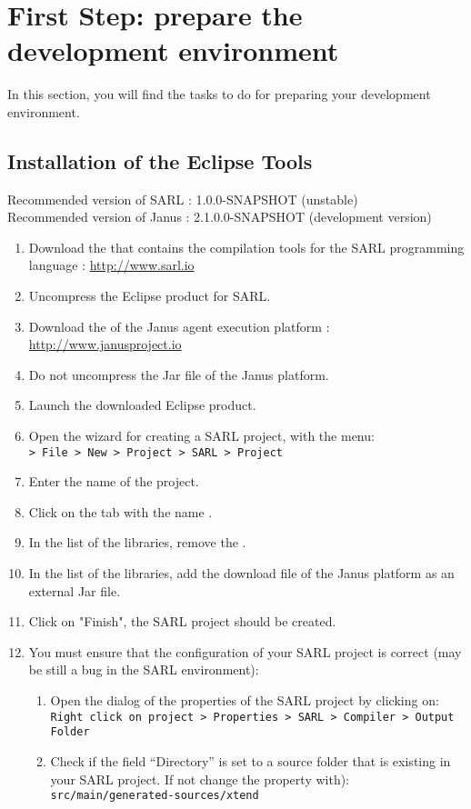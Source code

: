 \section{First Step: prepare the development environment}

In this section, you will find the tasks to do for preparing your development environment.

\subsection{Installation of the Eclipse Tools}

\begin{emphbox}
Recommended version of SARL : 1.0.0-SNAPSHOT (unstable) \\
Recommended version of Janus : 2.1.0.0-SNAPSHOT (development version)
\end{emphbox}

\begin{enumerate}
\item Download the  that contains the compilation tools for the SARL programming language : \url{http://www.sarl.io}
\item Uncompress the Eclipse product for SARL.
\item Download the  of the Janus agent execution platform : \url{http://www.janusproject.io}
\item Do not uncompress the Jar file of the Janus platform.
\item Launch the downloaded Eclipse product.
\item Open the wizard for creating a SARL project, with the menu: \\
	\texttt{> File > New > Project > SARL > Project}
\item Enter the name of the project.
\item Click on the tab with the name .
\item In the list of the libraries, remove the .
\item In the list of the libraries, add the download file of the Janus platform as an external Jar file.
\item Click on "Finish", the SARL project should be created.
\item You must ensure that the configuration of your SARL project is correct (may be still a bug in the SARL environment):
	\begin{enumerate}[a]
	\item Open the dialog of the properties of the SARL project by clicking on: \\
		\texttt{Right click on project > Properties > SARL > Compiler > Output Folder}
	\item Check if the field ``Directory'' is set to a source folder that is existing in your SARL project. If not change the property with): \\
		\texttt{src/main/generated-sources/xtend}
	\end{enumerate}
\end{enumerate}

